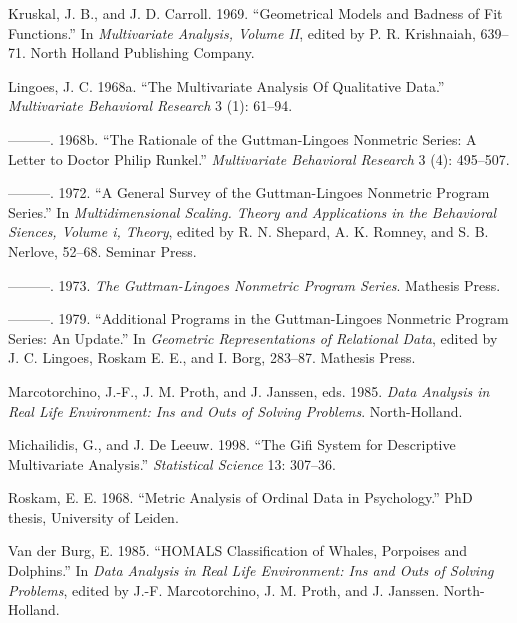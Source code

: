 \documentclass[
  12pt,
  letterpaper,
  DIV=11,
  numbers=noendperiod]{scrartcl}
\newlength{\cslhangindent}
\newenvironment{CSLReferences}[2] %
 {\begin{list}{}{%
  \setlength{\itemindent}{0pt}
  \setlength{\leftmargin}{0pt}
  \setlength{\parsep}{0pt}
  \ifodd #1
   \setlength{\leftmargin}{\cslhangindent}
   \setlength{\itemindent}{-1\cslhangindent}
  \fi
  \setlength{\itemsep}{#2\baselineskip}}}
 {\end{list}}
\begin{document}
\begin{CSLReferences}{1}{0}
Kruskal, J. B., and J. D. Carroll. 1969. {``{Geometrical Models and
Badness of Fit Functions}.''} In \emph{Multivariate Analysis, Volume
II}, edited by P. R. Krishnaiah, 639--71. North Holland Publishing
Company.

Lingoes, J. C. 1968a. {``{The Multivariate Analysis Of Qualitative
Data}.''} \emph{Multivariate Behavioral Research} 3 (1): 61--94.

---------. 1968b. {``{The Rationale of the Guttman-Lingoes Nonmetric
Series: A Letter to Doctor Philip Runkel}.''} \emph{Multivariate
Behavioral Research} 3 (4): 495--507.

---------. 1972. {``A General Survey of the Guttman-Lingoes Nonmetric
Program Series.''} In \emph{Multidimensional Scaling. Theory and
Applications in the Behavioral Siences, Volume i, Theory}, edited by R.
N. Shepard, A. K. Romney, and S. B. Nerlove, 52--68. Seminar Press.

---------. 1973. \emph{{The Guttman-Lingoes Nonmetric Program Series}}.
Mathesis Press.

---------. 1979. {``Additional Programs in the Guttman-Lingoes Nonmetric
Program Series: An Update.''} In \emph{{Geometric Representations of
Relational Data}}, edited by J. C. Lingoes, Roskam E. E., and I. Borg,
283--87. Mathesis Press.

Marcotorchino, J.-F., J. M. Proth, and J. Janssen, eds. 1985. \emph{Data
Analysis in Real Life Environment: Ins and Outs of Solving Problems}.
North-Holland.

Michailidis, G., and J. De Leeuw. 1998. {``The Gifi System for
Descriptive Multivariate Analysis.''} \emph{Statistical Science} 13:
307--36.

Roskam, E. E. 1968. {``{Metric Analysis of Ordinal Data in
Psychology}.''} PhD thesis, University of Leiden.

Van der Burg, E. 1985. {``HOMALS Classification of Whales, Porpoises and
Dolphins.''} In \emph{Data Analysis in Real Life Environment: Ins and
Outs of Solving Problems}, edited by J.-F. Marcotorchino, J. M. Proth,
and J. Janssen. North-Holland.


\end{CSLReferences}
\end{document}
